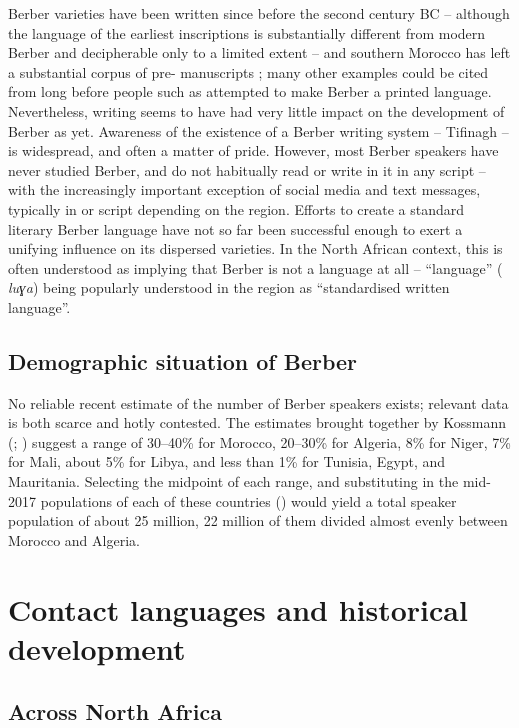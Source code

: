 \documentclass[output=paper]{langsci/langscibook}
\begin{document}
Berber varieties have been written since before the second century BC \citep{Pichler2007} – although the language of the earliest inscriptions is substantially different from modern Berber and decipherable only to a limited extent – and southern Morocco has left a substantial corpus of pre- manuscripts \citep{Boogert1997}; many other examples could be cited from long before people such as \citet{Mammeri1976} attempted to make Berber a printed language. Nevertheless, writing seems to have had very little impact on the development of Berber as yet. Awareness of the existence of a Berber writing system – Tifinagh – is widespread, and often a matter of pride. However, most Berber speakers have never studied Berber, and do not habitually read or write in it in any script – with the increasingly important exception of social media and text messages, typically in  or  script depending on the region. Efforts to create a standard literary Berber language have not so far been successful enough to exert a unifying influence on its dispersed varieties. In the North African context, this is often understood as implying that Berber is not a language at all – “language” ( \textit{luɣa}) being popularly understood in the region as “standardised written language”.
\largerpage
 
 \subsection{Demographic situation of Berber}


No reliable recent estimate of the number of Berber speakers exists; relevant data is both scarce and hotly contested. The estimates brought together by Kossmann (\citeyear[1]{Kossmann2011}; \citeyear[29--36]{Kossmann2013book}) suggest a range of 30–40\% for Morocco, 20–30\% for Algeria, 8\% for Niger, 7\% for {Mali}, about 5\% for Libya, and less than 1\% for Tunisia, Egypt, and Mauritania.  Selecting the midpoint of each range, and substituting in the mid-2017 populations of each of these countries (\citealt{CIA2017}) would yield a total speaker population of about 25 million, 22 million of them divided almost evenly between Morocco and Algeria.


 \section{Contact languages and historical development}


 \subsection{Across North Africa} \label{na}
\end{document}
